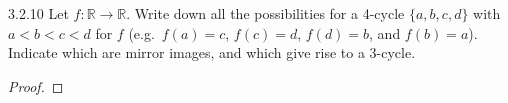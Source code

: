 \begin{problem}{3.2.10}
  Let $f : \mathbb{R} \to  \mathbb{R}$. Write down all the possibilities for a 4-cycle
  $\{a, b, c, d\}$ with $a < b < c < d$ for $f$
  (e.g.\ $f (a) = c$, $f (c) = d$, $f (d) = b$, and $f (b) = a$).
  Indicate which are mirror images, and which give rise to a 3-cycle.
\end{problem}

\begin{proof}
\end{proof}
\newpage
